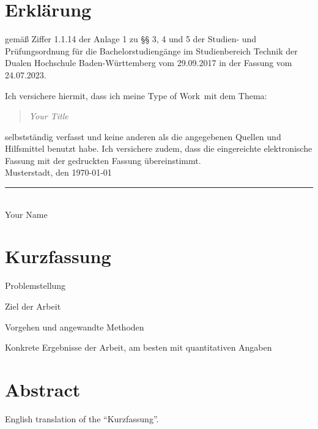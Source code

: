 \documentclass{scrbook} %
\newcommand{\titel}{Your Title}
\newcommand{\untertitel}{Your Subtitle}
\newcommand{\arbeit}{Type of Work}
\newcommand{\autor}{Your Name}
\begin{document}
\chapter*{Erklärung} %

gemäß Ziffer 1.1.14 der Anlage 1 zu §§ 3, 4 und 5  der Studien- und Prüfungsordnung für die Bachelorstudiengänge im Studienbereich Technik der Dualen Hochschule Baden-Württemberg vom 29.09.2017 in der Fassung vom 24.07.2023.

Ich versichere hiermit, dass ich meine \arbeit\ mit dem Thema:

\begin{quote}
	\textit{\titel} %
\end{quote}

selbstständig verfasst und keine anderen als die angegebenen Quellen und Hilfsmittel benutzt habe. Ich versichere zudem, dass die eingereichte elektronische Fassung mit der gedruckten Fassung übereinstimmt.\\[6ex]

Musterstadt, den \today \\[1ex]

\rule[-0.2cm]{5cm}{0.5pt} \\

\autor \\[10ex]

\rmfamily

\thispagestyle{empty}

\chapter*{Kurzfassung} %

Problemstellung

Ziel der Arbeit

Vorgehen und angewandte Methoden

Konkrete Ergebnisse der Arbeit, am besten mit quantitativen Angaben

\clearpage

\chapter*{Abstract} %

English translation of the ``Kurzfassung''.
\end{document}
